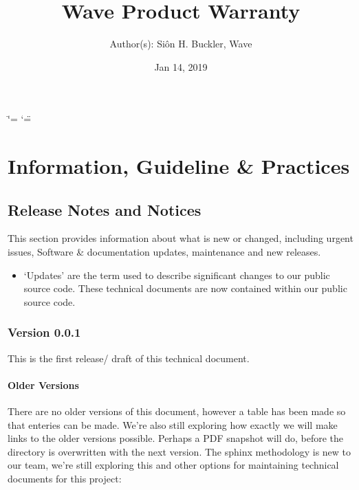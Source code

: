 \documentclass[letterpaper,10pt,english]{sphinxmanual}
\title{Wave Product Warranty}
\date{Jan 14, 2019}
\author{Author(s): Siôn H. Buckler, Wave}
\begin{document}
\ifdefined\shorthandoff
  \ifnum\catcode`\=\string=\active\shorthandoff{=}\fi
  \ifnum\catcode`\"=\active{}\fi
\fi
\maketitle
\sphinxtableofcontents
{}\label{\detokenize{index::doc}}



\chapter{Information, Guideline \& Practices}
\label{\detokenize{index:information-guideline-practices}}

\section{Release Notes and Notices}
\label{\detokenize{releasenotes:release-notes-and-notices}}\label{\detokenize{releasenotes::doc}}
This section provides information about what is new or changed, including urgent issues, Software \& documentation updates, maintenance and new releases.
\begin{itemize}
\item {} 
‘Updates’ are the term used to describe significant changes to our public source code. These technical documents are now contained within our public source code.

\end{itemize}


\subsection{Version 0.0.1}
\label{\detokenize{releasenotes:version-0-0-1}}
This is the first release/ draft of this technical document.


\subsubsection{Older Versions}
\label{\detokenize{releasenotes:older-versions}}
There are no older versions of this document, however a table has been made so that enteries can be made. We’re also still exploring how exactly we will make links to the older versions possible. Perhaps a PDF snapshot will do, before the directory is overwritten with the next version. The sphinx methodology is new to our team, we’re still exploring this and other options for maintaining technical documents for this project:
\end{document}
